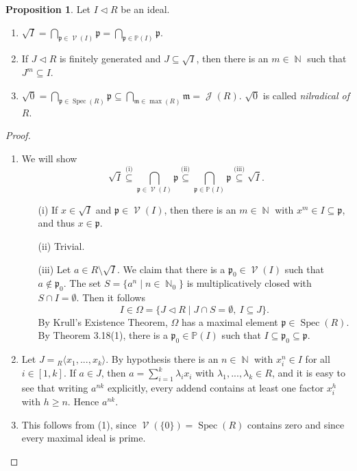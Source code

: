 \documentclass[12pt,a4paper]{report}
\theoremstyle{definition}
\newtheorem{proposition}[theorem]{Proposition}
\theoremstyle{num.custom-title}
\DeclareMathOperator{\J}{\mathcal{J}}
\DeclareMathOperator{\N}{\mathbb{N}}
\DeclareMathOperator{\V}{\mathcal{V}}
\DeclareMathOperator{\sm}{\setminus}
\DeclareMathOperator{\sse}{\subseteq}
\DeclareMathOperator{\Spec}{Spec}
\newcommand{\p}{\mathfrak{p}}
\newcommand{\m}{\mathfrak{m}}
\renewcommand{\P}{\mathbb{P}}
\begin{document}
\begin{proposition}
Let $I \lhd R$ be an ideal.
\begin{enumerate}
\item $\displaystyle \sqrt{I} = \bigcap_{\p \in \V(I)} \p = \bigcap_{\p \in \P(I)} \p$.
\item If $J \lhd R$ is finitely generated and $J \sse \sqrt{I}$, then there is an $m \in \N$ such that $J^m \sse I$.
\item $\displaystyle \sqrt{0} = \bigcap_{\p \in \Spec(R)} \p \sse \bigcap_{\m \in \max(R)} \m = \J(R)$. $\sqrt{0}$ is called \emph{nilradical of $R$}.
\end{enumerate}
\begin{proof}\ 
\begin{enumerate}
\item We will show
\[
\sqrt{I} \stackrel{\text{(i)}}{\sse} \bigcap_{\p \in \V(I)} \p \stackrel{\text{(ii)}}{\sse} \bigcap_{\p \in \P(I)} \p \stackrel{\text{(iii)}}{\sse} \sqrt{I}.
\]
\begin{enumerate}
\item[(i)] If $x \in \sqrt{I}$ and $\p \in \V(I)$, then there is an $m \in \N$ with $x^m \in I \sse \p$, and thus $x \in \p$.
\item[(ii)] Trivial.
\item[(iii)] Let $a \in R \sm \sqrt{I}$. We claim that there is a $\p_0 \in \V(I)$ such that $a \not\in \p_0$. The set $S=\{a^n \mid n \in \N_0 \}$ is multiplicatively closed with $S \cap I = \emptyset$. Then it follows
\[
I \in \Omega = \{ J \lhd R \mid J \cap S = \emptyset, \ I \sse J \}.
\]
By Krull's Existence Theorem, $\Omega$ has a maximal element $\p \in \Spec(R)$. By Theorem 3.18(1), there is a $\p_0 \in \P(I)$ such that $I \sse \p_0 \sse \p$.
\end{enumerate}
\item Let $J = {}_R \langle x_1,...,x_k \rangle$. By hypothesis there is an $n \in \N$ with $x_i^n \in I$ for all $i \in [1,k]$. If $a \in J$, then $a = \sum_{i=1}^k \lambda_i x_i$ with $\lambda_1,...,\lambda_k \in R$, and it is easy to see that writing $a^{nk}$ explicitly, every addend contains at least one factor $x_i^h$ with $h \geq n$. Hence $a^{nk}$.
\item This follows from (1), since $\V(\{0\}) = \Spec(R)$ contains zero and since every maximal ideal is prime.
\end{enumerate}
\end{proof}
\end{proposition}
\end{document}

